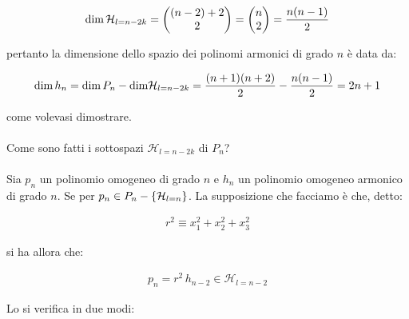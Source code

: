 \begin{align*}
	\text{dim} \, \mathcal{H}_{l = n - 2k} = \mqty( \qty(n-2) +2 \\ 2) = \mqty(n \\ 2) = \frac{n \qty(n-1)}{2}
\end{align*}
	
	pertanto la dimensione dello spazio dei polinomi armonici di grado $n$ è data da:
	
\begin{align*}
	\text{dim} \, h_n = \text{dim} \, P_n - \text{dim} \mathcal{H}_{l = n - 2k} = \frac{\qty(n +1) \qty(n+2)}{2} - \frac{n \qty(n-1)}{2} = 2n + 1
\end{align*}

	come volevasi dimostrare.
	\\
	\\
	Come sono fatti i sottospazi $\mathcal{H}_{l = n - 2k}$ di $P_n$?
	\\
	\\
	Sia $p_n$ un polinomio omogeneo di grado $n$ e $h_n$ un polinomio omogeneo armonico di grado $n$. Se per $p_n \in P_n - \qty{\mathcal{H}_{l = n}}$. La supposizione che facciamo è che, detto:
	
\begin{align*}
	r^2 \equiv x_1^2 + x_2^2 + x_3^2 
\end{align*}

	si ha allora che:
	
\begin{align*}
	p_n = r^2 \, h_{n-2} \in \mathcal{H}_{l = n -2 }
\end{align*}

	Lo si verifica in due modi:
	
